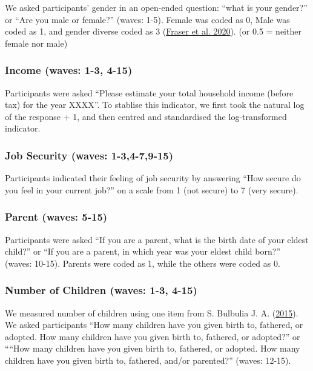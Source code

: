 \documentclass[
  singlecolumn]{report}
\begin{document}
We asked participants' gender in an open-ended question: ``what is your
gender?'' or ``Are you male or female?'' (waves: 1-5). Female was coded
as 0, Male was coded as 1, and gender diverse coded as 3
(\protect\hyperlink{ref-fraser_coding_2020}{Fraser et al. 2020}). (or
0.5 = neither female nor male)

\hypertarget{income-waves-1-3-4-15}{%
\subsubsection{Income (waves: 1-3, 4-15)}\label{income-waves-1-3-4-15}}

Participants were asked ``Please estimate your total household income
(before tax) for the year XXXX''. To stablise this indicator, we first
took the natural log of the response + 1, and then centred and
standardised the log-transformed indicator.

\hypertarget{job-security-waves-1-34-79-15}{%
\subsubsection{Job Security (waves:
1-3,4-7,9-15)}\label{job-security-waves-1-34-79-15}}

Participants indicated their feeling of job security by answering ``How
secure do you feel in your current job?'' on a scale from 1 (not secure)
to 7 (very secure).

\hypertarget{parent-waves-5-15}{%
\subsubsection{Parent (waves: 5-15)}\label{parent-waves-5-15}}

Participants were asked ``If you are a parent, what is the birth date of
your eldest child?'' or ``If you are a parent, in which year was your
eldest child born?'' (waves: 10-15). Parents were coded as 1, while the
others were coded as 0.

\hypertarget{number-of-children-waves-1-3-4-15}{%
\subsubsection{Number of Children (waves: 1-3,
4-15)}\label{number-of-children-waves-1-3-4-15}}

We measured number of children using one item from S. Bulbulia J. A.
(\protect\hyperlink{ref-Bulbulia_2015}{2015}). We asked participants
``How many children have you given birth to, fathered, or adopted. How
many children have you given birth to, fathered, or adopted?'' or
````How many children have you given birth to, fathered, or adopted. How
many children have you given birth to, fathered, and/or parented?''
(waves: 12-15).
\end{document}
